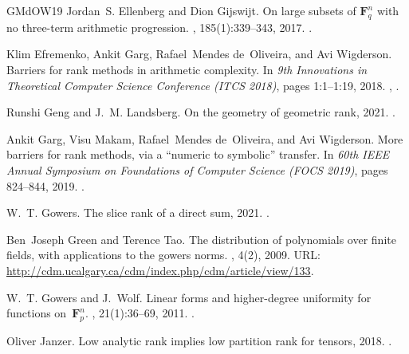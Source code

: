 \documentclass[10pt,a4paper]{article}
\theoremstyle{definition}
\theoremstyle{remark}
\begin{document}
\begin{thebibliography}{GMdOW19}
Jordan~S. Ellenberg and Dion Gijswijt.
\newblock On large subsets of {$\mathbf{F}^n_q$} with no three-term arithmetic
  progression.
, 185(1):339--343, 2017.
\newblock \href {https://doi.org/10.4007/annals.2017.185.1.8}
  {}.

Klim Efremenko, Ankit Garg, Rafael~Mendes de~Oliveira, and Avi Wigderson.
\newblock Barriers for rank methods in arithmetic complexity.
\newblock In {\em 9th Innovations in Theoretical Computer Science Conference
  ({ITCS} 2018)}, pages 1:1--1:19, 2018.
\newblock \href {http://arxiv.org/abs/1710.09502} {},
  \href {https://doi.org/10.4230/LIPIcs.ITCS.2018.1}
  {}.

Runshi Geng and J.~M. Landsberg.
\newblock On the geometry of geometric rank, 2021.
\newblock \href {http://arxiv.org/abs/2012.04679} {}.

Ankit Garg, Visu Makam, Rafael~Mendes de~Oliveira, and Avi Wigderson.
\newblock More barriers for rank methods, via a ``numeric to symbolic''
  transfer.
\newblock In {\em 60th {IEEE} Annual Symposium on Foundations of Computer
  Science ({FOCS} 2019)}, pages 824--844, 2019.
\newblock \href {https://doi.org/10.1109/FOCS.2019.00054}
  {}.

W.~T. Gowers.
\newblock The slice rank of a direct sum, 2021.
\newblock \href {http://arxiv.org/abs/2105.08394} {}.

Ben~Joseph Green and Terence Tao.
\newblock The distribution of polynomials over finite fields, with applications
  to the gowers norms.
, 4(2), 2009.
\newblock URL: \url{http://cdm.ucalgary.ca/cdm/index.php/cdm/article/view/133}.

W.~T. Gowers and J.~Wolf.
\newblock Linear forms and higher-degree uniformity for functions
  on~{$\mathbf{F}^n_p$}.
, 21(1):36--69, 2011.
\newblock \href {https://doi.org/10.1007/s00039-010-0106-3}
  {}.

Oliver Janzer.
\newblock Low analytic rank implies low partition rank for tensors, 2018.
\newblock \href {http://arxiv.org/abs/1809.10931} {}.


\end{thebibliography}
\end{document}
